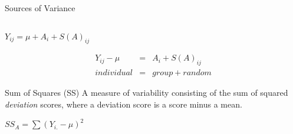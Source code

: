 \documentclass[presentation]{beamer}
\begin{document}
\begin{frame}[label={sec:orgfb5bcf0}]{Sources of Variance}
\begin{columns}
\begin{column}{.7\columnwidth}
\(Y_{ij} = \mu + A_i + S(A)_{ij}\)

\begin{eqnarray*}
Y_{ij}-\mu &=& A_i + S(A)_{ij}\\
individual &=& group + random
\end{eqnarray*}

\begin{block}{Sum of Squares (SS)}
A measure of variability consisting of the sum of squared \emph{deviation}
scores, where a deviation score is a score minus a mean.
\end{block}

\(SS_{A} = \sum \left(Y_{i.}-\mu\right)^2\)
\end{column}
\end{columns}
\end{frame}
\end{document}
